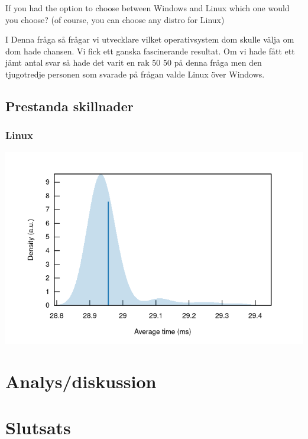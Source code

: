 \documentclass[12pt, a4paper]{report}
\begin{document}
 
   \vspace{1cm}
 
 
   \cite{form}
   \vspace{3cm}
 
   \large{If you had the option to choose between Windows and Linux which one would you choose? (of course, you can choose any distro for Linux)}
  
   \vspace{.5cm}
  
   \normalsize I Denna fråga så frågar vi utvecklare vilket operativsystem dom skulle välja om dom hade chansen. Vi fick ett ganska fascinerande resultat. Om vi hade fått ett jämt antal svar så hade det varit en rak 50 50 på denna fråga men den tjugotredje personen som svarade på frågan valde Linux över Windows.
 
   \vspace{1cm}
 
 
   \cite{form}
 
   \vspace{1cm}

   \subsection{Prestanda skillnader}

   \subsubsection{Linux}
   \includegraphics[width=1\textwidth]{bench_linux_average_time}


\section{Analys/diskussion}



\section{Slutsats}


\printbibliography
\end{document}
